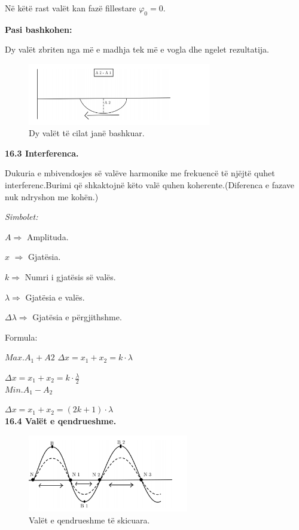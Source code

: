 \documentclass[twocolumn]{article}
\begin{document}
Në këtë rast valët kan fazë fillestare $\varphi_0=0$.


\textbf{Pasi bashkohen:}

Dy valët zbriten nga më e madhja tek më
e vogla dhe ngelet rezultatija.

	\begin{figure}[h]
	\includegraphics[width=80mm]{Imazhet/mbivendosja5.png}
	\caption{ Dy valët të cilat janë bashkuar.}
	\label{fig:boat1}
\end{figure}

\textbf{16.3 Interferenca.}

Dukuria e mbivendosjes së valëve harmonike me
frekuencë të njëjtë quhet interferenc.Burimi që shkaktojnë këto valë quhen koherente.(Diferenca e fazave
nuk ndryshon me kohën.)

\begin{center}
	\textit{Simbolet:}
\end{center}

$A \Rightarrow $ Amplituda.

$x$ $\Rightarrow$ Gjatësia.

$k \Rightarrow $ Numri i gjatësis së valës.

$\lambda  \Rightarrow$ Gjatësia e valës.

$\Delta \lambda  \Rightarrow $ Gjatësia e përgjithshme.

\begin{center}
	Formula:
\end{center}

$Max.A_1 + A2$
$\Delta x = x_1 + x_2 = k \cdot \lambda$

$\Delta x = x_1 + x_2 = k \cdot \frac{\lambda}{2}$\\

$Min.A_1 - A_2$

$\Delta x = x_1 + x_2 = (2k + 1) \cdot \lambda$\\

\textbf{16.4 Valët e qendrueshme.}

	\begin{figure}[h]
	\includegraphics[width=70mm]{Imazhet/Valet e qendrueshme.png}
	\caption{Valët e qendrueshme të skicuara.}
	\label{fig:boat1}
\end{figure}
\end{document}
